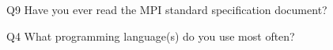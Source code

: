 \begin{description}%
\item{Q9} Have you ever read the MPI standard specification document?%
\item{Q4} What programming language(s) do you use most often?%
\end{description}%
